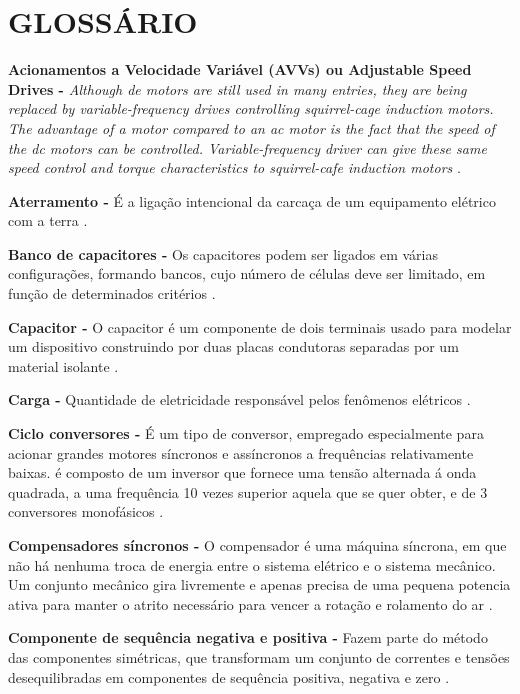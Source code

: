 \chapter*{GLOSSÁRIO}\label{gloss}
\singlespacing

\noindent
\textbf{Acionamentos a Velocidade Variável (AVVs) ou Adjustable Speed Drives -} \textit{Although de motors are still used in many entries, they are being replaced by variable-frequency drives controlling squirrel-cage induction motors. The advantage of a motor compared to an ac motor is the fact that the speed of the dc motors can be controlled. Variable-frequency driver can give these same speed control and torque characteristics to squirrel-cafe induction motors} \citep{SMI04}.

\noindent
\textbf{Aterramento -} É a ligação intencional da carcaça de um equipamento elétrico com a terra \citep{COR05}. 

\noindent
\textbf{Banco de capacitores -} Os capacitores podem ser ligados em várias configurações, formando bancos, cujo número de células deve ser limitado, em função de determinados critérios \citep{FIL05}.

\noindent
\textbf{Capacitor -} O capacitor é um componente de dois terminais usado para modelar um dispositivo construindo por duas placas condutoras separadas por um material isolante \citep{DOR08}.

\noindent
\textbf{Carga -} Quantidade de eletricidade responsável pelos fenômenos elétricos \citep{DOR08}.

\noindent
\textbf{Ciclo conversores -} É um tipo de conversor, empregado especialmente para acionar grandes motores síncronos e assíncronos a frequências relativamente baixas. é composto de um inversor que fornece uma tensão alternada á onda quadrada, a uma frequência 10 vezes superior aquela que se quer obter, e de 3 conversores monofásicos \citep{FIN02}.

\noindent
\textbf{Compensadores síncronos -} O compensador é uma máquina síncrona, em que não há nenhuma troca de energia entre o sistema elétrico e o sistema mecânico. Um conjunto mecânico gira livremente e apenas precisa de uma pequena potencia ativa para manter o atrito necessário para vencer a rotação e rolamento do ar \citep{ANT03}.

\noindent
\textbf{Componente de sequência negativa e positiva -} Fazem parte do método das componentes simétricas, que transformam um conjunto de correntes e tensões desequilibradas em componentes de sequência positiva, negativa e zero \citep{CAB10}.


